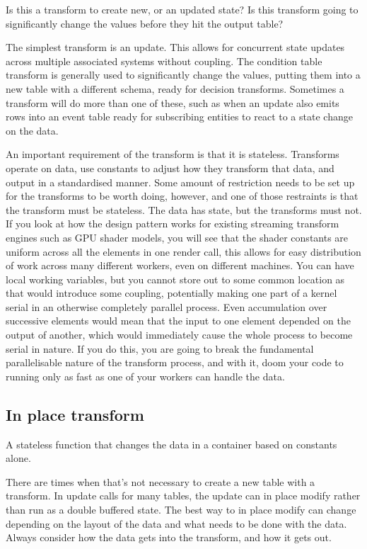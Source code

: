 Is this a transform to create new, or an updated state? Is this transform
going to significantly change the values before they hit the output table?

The simplest transform is an update. This allows for concurrent state updates
across multiple associated systems without coupling. The condition table
transform is generally used to significantly change the values, putting them
into a new table with a different schema, ready for decision transforms.
Sometimes a transform will do more than one of these, such as when an update
also emits rows into an event table ready for subscribing entities to react to
a state change on the data.

An important requirement of the transform is that it is stateless. Transforms
operate on data, use constants to adjust how they transform that data, and
output in a standardised manner. Some amount of restriction needs to be set up
for the transforms to be worth doing, however, and one of those restraints is
that the transform must be stateless. The data has state, but the transforms
must not. If you look at how the design pattern works for existing streaming
transform engines such as GPU shader models, you will see that the shader
constants are uniform across all the elements in one render call, this allows
for easy distribution of work across many different workers, even on different
machines. You can have local working variables, but you cannot store out to
some common location as that would introduce some coupling, potentially making
one part of a kernel serial in an otherwise completely parallel process. Even
accumulation over successive elements would mean that the input to one element
depended on the output of another, which would immediately cause the whole
process to become serial in nature.  If you do this, you are going to break the
fundamental parallelisable nature of the transform process, and with it, doom
your code to running only as fast as one of your workers can handle the data.

\subsection{In place transform}

A stateless function that changes the data in a container based on constants
alone.

There are times when that's not necessary to create a new table with a
transform. In update calls for many tables, the update can in place modify
rather than run as a double buffered state. The best way to in place modify can
change depending on the layout of the data and what needs to be done with the
data. Always consider how the data gets into the transform, and how it gets
out.


